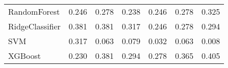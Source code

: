 \begin{tabular}{lllllll}
                   RandomForest & 0.246 &                     0.278 &                 0.238 &                  0.246 &                                   0.278 &     0.325 \\
                RidgeClassifier & 0.381 &                     0.381 &                 0.317 &                  0.246 &                                   0.278 &     0.294 \\
                            SVM & 0.317 &                     0.063 &                 0.079 &                  0.032 &                                   0.063 &     0.008 \\
                        XGBoost & 0.230 &                     0.381 &                 0.294 &                  0.278 &                                   0.365 &     0.405 \\
\bottomrule
\end{tabular}
